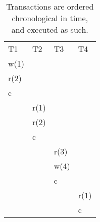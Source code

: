 \begin{table}[h]
    \begin{tabular}{l|l|l|l}
        T1   & T2   & T3   & T4   \\
        w(1) &      &      &      \\
        r(2) &      &      &      \\
        c    &      &      &      \\
        & r(1) &      &      \\
        & r(2) &      &      \\
        & c    &      &      \\
        &      & r(3) &      \\
        &      & w(4) &      \\
        &      & c    &      \\
        &      &      & r(1) \\
        &      &      & c
    \end{tabular}
    \caption{Transactions are ordered chronological in time, and executed as such.}
\end{table}